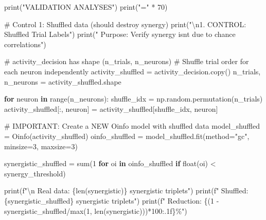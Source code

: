 \documentclass[
  11pt,
  letterpaper,
  oneside,
  openany]{book}
\newenvironment{Shaded}{\begin{snugshade}}{\end{snugshade}}
\newcommand{\BuiltInTok}[1]{\textcolor[rgb]{0.00,0.23,0.31}{#1}}
\newcommand{\CharTok}[1]{\textcolor[rgb]{0.13,0.47,0.30}{#1}}
\newcommand{\CommentTok}[1]{\textcolor[rgb]{0.37,0.37,0.37}{#1}}
\newcommand{\ControlFlowTok}[1]{\textcolor[rgb]{0.00,0.23,0.31}{\textbf{#1}}}
\newcommand{\DecValTok}[1]{\textcolor[rgb]{0.68,0.00,0.00}{#1}}
\newcommand{\KeywordTok}[1]{\textcolor[rgb]{0.00,0.23,0.31}{\textbf{#1}}}
\newcommand{\NormalTok}[1]{\textcolor[rgb]{0.00,0.23,0.31}{#1}}
\newcommand{\OperatorTok}[1]{\textcolor[rgb]{0.37,0.37,0.37}{#1}}
\newcommand{\SpecialCharTok}[1]{\textcolor[rgb]{0.37,0.37,0.37}{#1}}
\newcommand{\SpecialStringTok}[1]{\textcolor[rgb]{0.13,0.47,0.30}{#1}}
\newcommand{\StringTok}[1]{\textcolor[rgb]{0.13,0.47,0.30}{#1}}
\begin{document}
\begin{Shaded}
\begin{Highlighting}[]
\BuiltInTok{print}\NormalTok{(}\StringTok{"VALIDATION ANALYSES"}\NormalTok{)}
\BuiltInTok{print}\NormalTok{(}\StringTok{"="} \OperatorTok{*} \DecValTok{70}\NormalTok{)}

\CommentTok{\# Control 1: Shuffled data (should destroy synergy)}
\BuiltInTok{print}\NormalTok{(}\StringTok{"}\CharTok{\textbackslash{}n}\StringTok{1. CONTROL: Shuffled Trial Labels"}\NormalTok{)}
\BuiltInTok{print}\NormalTok{(}\StringTok{"   Purpose: Verify synergy isn\textquotesingle{}t due to chance correlations"}\NormalTok{)}

\CommentTok{\# activity\_decision has shape (n\_trials, n\_neurons)}
\CommentTok{\# Shuffle trial order for each neuron independently}
\NormalTok{activity\_shuffled }\OperatorTok{=}\NormalTok{ activity\_decision.copy()}
\NormalTok{n\_trials, n\_neurons }\OperatorTok{=}\NormalTok{ activity\_shuffled.shape}

\ControlFlowTok{for}\NormalTok{ neuron }\KeywordTok{in} \BuiltInTok{range}\NormalTok{(n\_neurons):}
\NormalTok{    shuffle\_idx }\OperatorTok{=}\NormalTok{ np.random.permutation(n\_trials)}
\NormalTok{    activity\_shuffled[:, neuron] }\OperatorTok{=}\NormalTok{ activity\_shuffled[shuffle\_idx, neuron]}

\CommentTok{\# IMPORTANT: Create a NEW Oinfo model with shuffled data}
\NormalTok{model\_shuffled }\OperatorTok{=}\NormalTok{ Oinfo(activity\_shuffled)}
\NormalTok{oinfo\_shuffled }\OperatorTok{=}\NormalTok{ model\_shuffled.fit(method}\OperatorTok{=}\StringTok{"gc"}\NormalTok{, minsize}\OperatorTok{=}\DecValTok{3}\NormalTok{, maxsize}\OperatorTok{=}\DecValTok{3}\NormalTok{)}

\NormalTok{synergistic\_shuffled }\OperatorTok{=} \BuiltInTok{sum}\NormalTok{(}\DecValTok{1} \ControlFlowTok{for}\NormalTok{ oi }\KeywordTok{in}\NormalTok{ oinfo\_shuffled }\ControlFlowTok{if} \BuiltInTok{float}\NormalTok{(oi) }\OperatorTok{\textless{}}\NormalTok{ synergy\_threshold)}

\BuiltInTok{print}\NormalTok{(}\SpecialStringTok{f"}\CharTok{\textbackslash{}n}\SpecialStringTok{   Real data: }\SpecialCharTok{\{}\BuiltInTok{len}\NormalTok{(synergistic)}\SpecialCharTok{\}}\SpecialStringTok{ synergistic triplets"}\NormalTok{)}
\BuiltInTok{print}\NormalTok{(}\SpecialStringTok{f"   Shuffled:  }\SpecialCharTok{\{}\NormalTok{synergistic\_shuffled}\SpecialCharTok{\}}\SpecialStringTok{ synergistic triplets"}\NormalTok{)}
\BuiltInTok{print}\NormalTok{(}\SpecialStringTok{f"   Reduction: }\SpecialCharTok{\{}\NormalTok{(}\DecValTok{1} \OperatorTok{{-}}\NormalTok{ synergistic\_shuffled}\OperatorTok{/}\BuiltInTok{max}\NormalTok{(}\DecValTok{1}\NormalTok{, }\BuiltInTok{len}\NormalTok{(synergistic)))}\OperatorTok{*}\DecValTok{100}\SpecialCharTok{:.1f\}}\SpecialStringTok{\%"}\NormalTok{)}


\end{Highlighting}
\end{Shaded}
\end{document}
